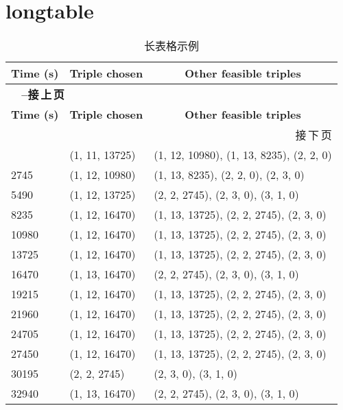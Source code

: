 \documentclass{article}
\begin{document}
\section{longtable}
\begin{longtable}{|l|l|l|}
    \caption{长表格示例\label{tab-long-example}} \\
    \hline
    \multicolumn{1}{|c|}{\textbf{Time (s)}} &
    \multicolumn{1}{c|}{\textbf{Triple chosen}} &
    \multicolumn{1}{c|}{\textbf{Other feasible triples}} \\ \hline
    \endfirsthead
    \multicolumn{3}{l}{{\bfseries\tablename\ \thetable{} --接\,上\,页}} \\
    \hline \multicolumn{1}{|c|}{\textbf{Time (s)}} &
    \multicolumn{1}{c|}{\textbf{Triple chosen}} &
    \multicolumn{1}{c|}{\textbf{Other feasible triples}} \\ \hline
    \endhead
    \hline \multicolumn{3}{|r|}{{接\,下\,页}} \\ \hline
    \endfoot
    \hline \hline
    \endlastfoot
    0      & (1, 11, 13725) & (1, 12, 10980), (1, 13, 8235), (2, 2, 0) \\
    2745   & (1, 12, 10980) & (1, 13,  8235), (2,  2,    0), (2, 3, 0) \\
    5490   & (1, 12, 13725) & (2,  2,  2745), (2,  3,    0), (3, 1, 0) \\
    8235   & (1, 12, 16470) & (1, 13, 13725), (2,  2, 2745), (2, 3, 0) \\
    10980  & (1, 12, 16470) & (1, 13, 13725), (2,  2, 2745), (2, 3, 0) \\
    13725  & (1, 12, 16470) & (1, 13, 13725), (2,  2, 2745), (2, 3, 0) \\
    16470  & (1, 13, 16470) & (2,  2,  2745), (2,  3,    0), (3, 1, 0) \\
    19215  & (1, 12, 16470) & (1, 13, 13725), (2,  2, 2745), (2, 3, 0) \\
    21960  & (1, 12, 16470) & (1, 13, 13725), (2,  2, 2745), (2, 3, 0) \\
    24705  & (1, 12, 16470) & (1, 13, 13725), (2,  2, 2745), (2, 3, 0) \\
    27450  & (1, 12, 16470) & (1, 13, 13725), (2,  2, 2745), (2, 3, 0) \\
    30195  & (2,  2,  2745) & (2,  3,     0), (3,  1,    0)            \\
    32940  & (1, 13, 16470) & (2,  2,  2745), (2,  3,    0), (3, 1, 0) \\

\end{longtable}
\end{document}
